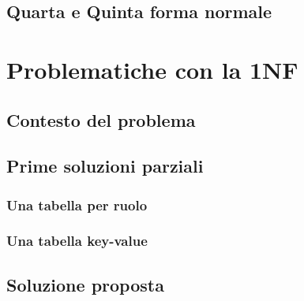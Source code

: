 \documentclass[10pt,twoside,cucitura]{toptesi}
\begin{document}
\section{Quarta e Quinta forma normale}

\chapter{Problematiche con la 1NF}

\section{Contesto del problema}

\section{Prime soluzioni parziali}
\subsection{Una tabella per ruolo}
\subsection{Una tabella key-value}

\section{Soluzione proposta}
\label{sec:soluzione}
\end{document}
